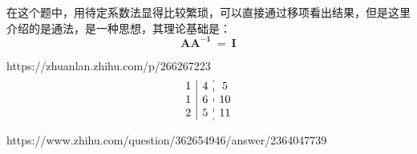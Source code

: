 \documentclass{ctexart}
\begin{document}
            在这个题中，用待定系数法显得比较繁琐，可以直接通过移项看出结果，但是这里介绍的是通法，是一种思想，其理论基础是：
            $$ \mathbf{AA^{-1}}~=~\mathbf{I}$$
            \vrule width11cm height1.5pt depth-1pt %
            
            https://zhuanlan.zhihu.com/p/266267223
            $$
            \begin{array}{c|c:c}
                1 & 4 & 5\\
                1 & 6 & 10\\
                2 & 5 & 11\\
            \end{array}
            $$


            https://www.zhihu.com/question/362654946/answer/2364047739
            
\end{document}
